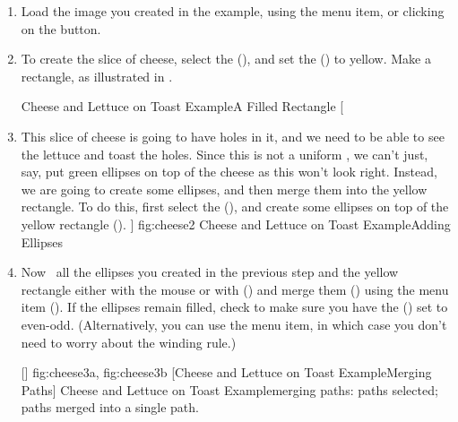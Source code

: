 \begin{enumerate}
\item Load the image you created in the
 example, using the
 menu item, or clicking on the 
button.

\item To create the slice of cheese, select the
 (), and set the
 () to yellow.
Make a rectangle, as illustrated in .

{}
{Cheese and Lettuce on Toast Example\dash A Filled Rectangle}
[
  \item This slice of cheese is going to have holes in it, and we need
  to be able to see the lettuce and toast  the holes. Since
  this is not a uniform , we can't just, say, put green ellipses
  on top of the cheese as this won't look right. Instead, we are going
  to create some ellipses, and then merge them into the yellow rectangle.
  To do this, first select the
   (), and create some
  ellipses on top of the yellow rectangle ().
]
{fig:cheese2}
{}
{Cheese and Lettuce on Toast Example\dash Adding Ellipses}

\item Now \select\ all the ellipses
you created in the previous step and the yellow rectangle
either with the mouse or with 
() and 
merge them () using the
 menu item ().
If the ellipses remain filled, check to make sure you have the
 () set to even-odd.
(Alternatively, you can use the 
menu item, in which case you don't need to worry about the winding
rule.)

[]
{
  {fig:cheese3a}{}{},
  {fig:cheese3b}{}{}
}
[Cheese and Lettuce on Toast Example\dash Merging Paths]
{Cheese and Lettuce on Toast Example\dash merging paths:
 paths selected;
 paths merged into a single
path.}

\end{enumerate}

